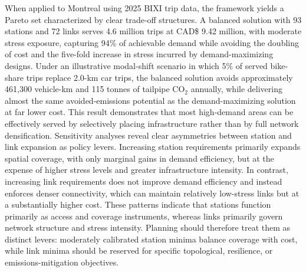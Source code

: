 \documentclass[preprint,authoryear,10pt]{elsarticle}
\begin{document}
When applied to Montreal using 2025 BIXI trip data, the framework yields a Pareto set characterized by clear trade-off structures. A balanced solution with 93 stations and 72 links serves 4.6 million trips at CAD\$ 9.42 million, with moderate stress exposure, capturing 94\% of achievable demand while avoiding the doubling of cost and the five-fold increase in stress incurred by demand-maximizing designs. Under an illustrative modal-shift scenario in which 5\% of served bike-share trips replace 2.0-km car trips, the balanced solution avoids approximately 461,300 vehicle-km and 115 tonnes of tailpipe CO$_2$ annually, while delivering almost the same avoided-emissions potential as the demand-maximizing solution at far lower cost. This result demonstrates that most high-demand areas can be effectively served by selectively placing infrastructure rather than by full network densification. Sensitivity analyses reveal clear asymmetries between station and link expansion as policy levers. Increasing station requirements primarily expands spatial coverage, with only marginal gains in demand efficiency, but at the expense of higher stress levels and greater infrastructure intensity. In contrast, increasing link requirements does not improve demand efficiency and instead enforces denser connectivity, which can maintain relatively low-stress links but at a substantially higher cost. These patterns indicate that stations function primarily as access and coverage instruments, whereas links primarily govern network structure and stress intensity. Planning should therefore treat them as distinct levers: moderately calibrated station minima balance coverage with cost, while link minima should be reserved for specific topological, resilience, or emissions-mitigation objectives. 
\end{document}

